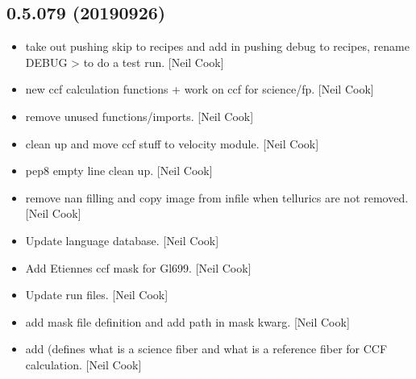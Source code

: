 \documentclass[a4paper,10pt,english]{report}
\begin{document}
\subsection{0.5.079 (2019\sphinxhyphen{}09\sphinxhyphen{}26)}
\label{\detokenize{misc/changelog:id82}}\begin{itemize}
\item {} 
 \sphinxhyphen{} take out pushing skip to recipes
and add in pushing debug to recipes, rename DEBUG \textendash{}\textgreater{}  to do a
test run. {[}Neil Cook{]}

\item {} 
 \sphinxhyphen{} new ccf calculation functions + work on
ccf for science/fp. {[}Neil Cook{]}

\item {} 
 \sphinxhyphen{} remove unused functions/imports.
{[}Neil Cook{]}

\item {} 
 \sphinxhyphen{} clean up and move ccf stuff to velocity
module. {[}Neil Cook{]}

\item {} 
 \sphinxhyphen{} pep8 empty line clean up. {[}Neil Cook{]}

\item {} 
 \sphinxhyphen{} remove nan filling and copy image from infile when
tellurics are not removed. {[}Neil Cook{]}

\item {} 
Update language database. {[}Neil Cook{]}

\item {} 
Add Etiennes ccf mask for Gl699. {[}Neil Cook{]}

\item {} 
Update run files. {[}Neil Cook{]}

\item {} 
 \sphinxhyphen{} add mask file
definition and add path in \textendash{}mask kwarg. {[}Neil Cook{]}

\item {} 
 \sphinxhyphen{} add  (defines what is a
science fiber and what is a reference fiber for CCF calculation. {[}Neil
Cook{]}


\end{itemize}
\end{document}
